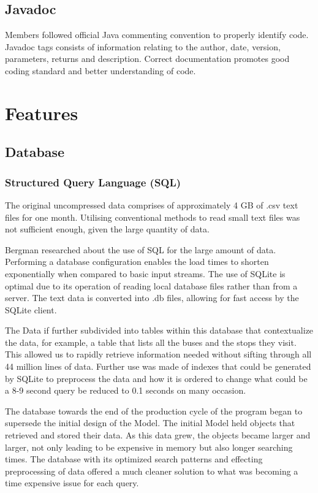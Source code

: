\documentclass[]{article}
\begin{document}
	\subsection{Javadoc}
	
	Members followed official Java commenting convention to properly identify code. Javadoc tags consists of information relating to the author, date, version, parameters, returns and description. Correct documentation promotes good coding standard and better understanding of code.
	
	\section{Features}
	
	\subsection{Database}
	
	\subsubsection{Structured Query Language (SQL)}
	
	The original uncompressed data comprises of approximately 4 GB of .csv text files for one month. Utilising conventional methods to read small text files was not sufficient enough, given the large quantity of data.
	
	Bergman researched about the use of SQL for the large amount of data. Performing a database configuration enables the load times to shorten exponentially when compared to basic input streams. The use of SQLite is optimal due to its operation of reading local database files rather than from a server. The text data is converted into .db files, allowing for fast access by the SQLite client.
	
	The Data if further subdivided into tables within this database that contextualize the data, for example, a table that lists all the buses and the stops they visit. This allowed us to rapidly retrieve information needed without sifting through all 44 million lines of data. Further use was made of indexes that could be generated by SQLite to preprocess the data and how it is ordered to change what could be a 8-9 second query be reduced to 0.1 seconds on many occasion.
	
	The database towards the end of the production cycle of the program began to supersede the initial design of the Model. The initial Model held objects that retrieved and stored their data. As this data grew, the objects became larger and larger, not only leading to be expensive in memory but also longer searching times. The database with its optimized search patterns and effecting preprocessing of data offered a much cleaner solution to what was becoming a time expensive issue for each query.
	
\end{document}
